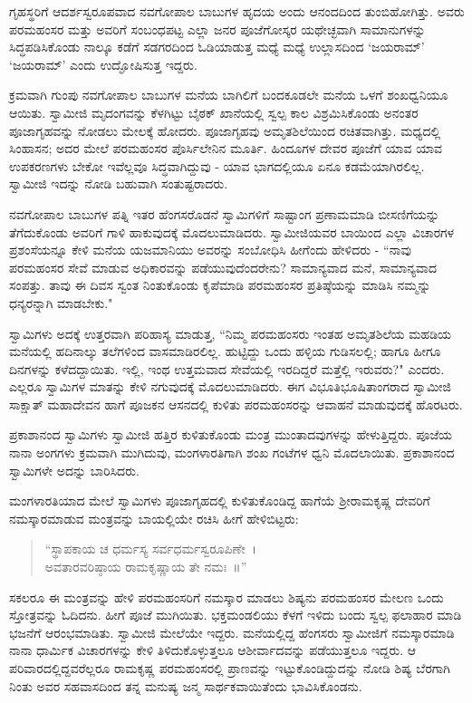 ಗೃಹಸ್ಥರಿಗೆ ಆದರ್ಶಸ್ವರೂಪವಾದ ನವಗೋಪಾಲ ಬಾಬುಗಳ ಹೃದಯ ಅಂದು ಆನಂದದಿಂದ ತುಂಬಿಹೋಗಿತ್ತು. ಅವರು ಪರಮಹಂಸರ ಮತ್ತು ಅವರಿಗೆ ಸಂಬಂಧಪಟ್ಟ ಎಲ್ಲಾ ಜನರ ಪೂಜೆಗೋಸ್ಕರ ಯಥೇಚ್ಛವಾಗಿ ಸಾಮಾನುಗಳನ್ನು ಸಿದ್ಧಪಡಿಸಿಕೊಂಡು ನಾಲ್ಕೂ ಕಡೆಗೆ ಸಡಗರದಿಂದ ಓಡಿಯಾಡುತ್ತ ಮಧ್ಯೆ ಮಧ್ಯೆ ಉಲ್ಲಾಸದಿಂದ ‘ಜಯರಾಮ್’ ‘ಜಯರಾಮ್’ ಎಂದು ಉದ್ಘೋಷಿಸುತ್ತ ಇದ್ದರು.

ಕ್ರಮವಾಗಿ ಗುಂಪು ನವಗೋಪಾಲ ಬಾಬುಗಳ ಮನೆಯ ಬಾಗಿಲಿಗೆ ಬಂದಕೂಡಲೇ ಮನೆಯ ಒಳಗೆ ಶಂಖಧ್ವನಿಯೂ ಆಯಿತು. ಸ್ವಾಮೀಜಿ ಮೃದಂಗವನ್ನು ಕೆಳಗಿಟ್ಟು ಬೈಠಕ್ ಖಾನೆಯಲ್ಲಿ ಸ್ವಲ್ಪ ಕಾಲ ವಿಶ್ರಮಿಸಿಕೊಂಡು ಅನಂತರ ಪೂಜಾಗೃಹವನ್ನು ನೋಡಲು ಮೇಲಕ್ಕೆ ಹೋದರು. ಪೂಜಾಗೃಹವು ಅಮೃತಶಿಲೆಯಿಂದ ರಚಿತವಾಗಿತ್ತು. ಮಧ್ಯದಲ್ಲಿ ಸಿಂಹಾಸನ; ಅದರ ಮೇಲೆ ಪರಮಹಂಸರ ಪೊರ್ಸಿಲೇನಿನ ಮೂರ್ತಿ. ಹಿಂದೂಗಳ ದೇವರ ಪೂಜೆಗೆ ಯಾವ ಯಾವ ಉಪಕರಣಗಳು ಬೇಕೋ ಇವೆಲ್ಲವೂ ಸಿದ್ಧವಾಗಿದ್ದುವು - ಯಾವ ಭಾಗದಲ್ಲಿಯೂ ಏನೂ ಕಡಮೆಯಾಗಿರಲಿಲ್ಲ. ಸ್ವಾಮೀಜಿ ಇದನ್ನು ನೋಡಿ ಬಹುವಾಗಿ ಸಂತುಷ್ಟರಾದರು.

ನವಗೋಪಾಲ ಬಾಬುಗಳ ಪತ್ನಿ ಇತರ ಹೆಂಗಸರೊಡನೆ ಸ್ವಾಮಿಗಳಿಗೆ ಸಾಷ್ಟಾಂಗ ಪ್ರಣಾಮಮಾಡಿ ಬೀಸಣಿಗೆಯನ್ನು ತೆಗೆದುಕೊಂಡು ಅವರಿಗೆ ಗಾಳಿ ಹಾಕುವುದಕ್ಕೆ ಮೊದಲುಮಾಡಿದರು. ಸ್ವಾಮೀಜಿಯವರ ಬಾಯಿಂದ ಎಲ್ಲಾ ವಿಚಾರಗಳ ಪ್ರಶಂಸೆಯನ್ನೂ ಕೇಳಿ ಮನೆಯ ಯಜಮಾನಿಯು ಅವರನ್ನು ಸಂಬೋಧಿಸಿ ಹೀಗೆಂದು ಹೇಳಿದರು - “ನಾವು ಪರಮಹಂಸರ ಸೇವೆ ಮಾಡುವ ಅಧಿಕಾರವನ್ನು ಪಡೆಯುವುದೆಂದರೇನು? ಸಾಮಾನ್ಯವಾದ ಮನೆ, ಸಾಮಾನ್ಯವಾದ ಸಂಪತ್ತು. ತಾವು ಈ ದಿವಸ ಸ್ವಂತ ನಿಂತುಕೊಂಡು ಕೃಪೆಮಾಡಿ ಪರಮಹಂಸರ ಪ್ರತಿಷ್ಠೆಯನ್ನು ಮಾಡಿಸಿ ನಮ್ಮನ್ನು ಧನ್ಯರನ್ನಾಗಿ ಮಾಡಬೇಕು."

ಸ್ವಾಮಿಗಳು ಅದಕ್ಕೆ ಉತ್ತರವಾಗಿ ಪರಿಹಾಸ್ಯ ಮಾಡುತ್ತ, “ನಿಮ್ಮ ಪರಮಹಂಸರು ಇಂತಹ ಅಮೃತಶಿಲೆಯ ಮಹಡಿಯ ಮನೆಯಲ್ಲಿ ಹದಿನಾಲ್ಕು ತಲೆಗಳಿಂದ ವಾಸಮಾಡಿರಲಿಲ್ಲ. ಹುಟ್ಟಿದ್ದು ಒಂದು ಹಳ್ಳಿಯ ಗುಡಿಸಲಲ್ಲಿ; ಹಾಗೂ ಹೀಗೂ ದಿನಗಳನ್ನು ಕಳೆದದ್ದಾಯಿತು. ಇಲ್ಲಿ, ಇಂಥ ಉತ್ತಮವಾದ ಸೇವೆಯಲ್ಲಿ ಇರದಿದ್ದರೆ ಮತ್ತೆಲ್ಲಿ ಇರುವರು?" ಎಂದರು. ಎಲ್ಲರೂ ಸ್ವಾಮಿಗಳ ಮಾತನ್ನು ಕೇಳಿ ನಗುವುದಕ್ಕೆ ಮೊದಲುಮಾಡಿದರು. ಈಗ ವಿಭೂತಿಭೂಷಿತಾಂಗರಾದ ಸ್ವಾಮೀಜಿ ಸಾಕ್ಷಾತ್ ಮಹಾದೇವನ ಹಾಗೆ ಪೂಜಕನ ಆಸನದಲ್ಲಿ ಕುಳಿತು ಪರಮಹಂಸರನ್ನು ಆವಾಹನೆ ಮಾಡುವುದಕ್ಕೆ ಹೊರಟರು.

ಪ್ರಕಾಶಾನಂದ ಸ್ವಾಮಿಗಳು ಸ್ವಾಮೀಜಿ ಹತ್ತಿರ ಕುಳಿತುಕೊಂಡು ಮಂತ್ರ ಮುಂತಾದವುಗಳನ್ನು ಹೇಳುತ್ತಿದ್ದರು. ಪೂಜೆಯ ನಾನಾ ಅಂಗಗಳು ಕ್ರಮವಾಗಿ ಮುಗಿದುವು, ಮಂಗಳಾರತಿಗಾಗಿ ಶಂಖ ಗಂಟೆಗಳ ಧ್ವನಿ ಮೊದಲಾಯಿತು. ಪ್ರಕಾಶಾನಂದ ಸ್ವಾಮಿಗಳೇ ಅದನ್ನು ಬಾರಿಸಿದರು.

ಮಂಗಳಾರತಿಯಾದ ಮೇಲೆ ಸ್ವಾಮಿಗಳು ಪೂಜಾಗೃಹದಲ್ಲಿ ಕುಳಿತುಕೊಂಡಿದ್ದ ಹಾಗೆಯೆ ಶ‍್ರೀರಾಮಕೃಷ್ಣ ದೇವರಿಗೆ ನಮಸ್ಕಾರಮಾಡುವ ಮಂತ್ರವನ್ನು ಬಾಯಲ್ಲಿಯೇ ರಚಿಸಿ ಹೀಗೆ ಹೇಳಿಬಿಟ್ಟರು:

\begin{verse}
“ಸ್ಥಾಪಕಾಯ ಚ ಧರ್ಮಸ್ಯ ಸರ್ವಧರ್ಮಸ್ವರೂಪಿಣೇ~।\\ಅವತಾರವರಿಷ್ಠಾಯ ರಾಮಕೃಷ್ಣಾಯ ತೇ ನಮಃ~॥”
\end{verse}

ಸಕಲರೂ ಈ ಮಂತ್ರವನ್ನು ಹೇಳಿ ಪರಮಹಂಸರಿಗೆ ನಮಸ್ಕಾರ ಮಾಡಲು ಶಿಷ್ಯನು ಪರಮಹಂಸರ ಮೇಲಣ ಒಂದು ಸ್ತೋತ್ರವನ್ನು ಓದಿದನು. ಹೀಗೆ ಪೂಜೆ ಮುಗಿಯಿತು. ಭಕ್ತಮಂಡಲಿಯು ಕೆಳಗೆ ಇಳಿದು ಬಂದು ಸ್ವಲ್ಪ ಫಲಾಹಾರ ಮಾಡಿ ಭಜನೆಗೆ ಆರಂಭಮಾಡಿತು. ಸ್ವಾಮೀಜಿ ಮೇಲೆಯೇ ಇದ್ದರು. ಮನೆಯಲ್ಲಿದ್ದ ಹೆಂಗಸರು ಸ್ವಾಮೀಜಿಗೆ ನಮಸ್ಕಾರಮಾಡಿ ನಾನಾ ಧಾರ್ಮಿಕ ವಿಚಾರಗಳನ್ನು ಕೇಳಿ ತಿಳಿದುಕೊಳ್ಳುತ್ತಲೂ ಆಶೀರ್ವಾದವನ್ನು ಪಡೆಯುತ್ತಲೂ ಇದ್ದರು. ಆ ಪರಿವಾರದಲ್ಲಿದ್ದವರೆಲ್ಲರೂ ರಾಮಕೃಷ್ಣ ಪರಮಹಂಸರಲ್ಲಿ ಪ್ರಾಣವನ್ನು ಇಟ್ಟುಕೊಂಡಿದ್ದುದನ್ನು ನೋಡಿ ಶಿಷ್ಯ ಬೆರಗಾಗಿ ನಿಂತು ಅವರ ಸಹವಾಸದಿಂದ ತನ್ನ ಮನುಷ್ಯ ಜನ್ಮ ಸಾರ್ಥಕವಾಯಿತೆಂದು ಭಾವಿಸಿಕೊಂಡನು.

